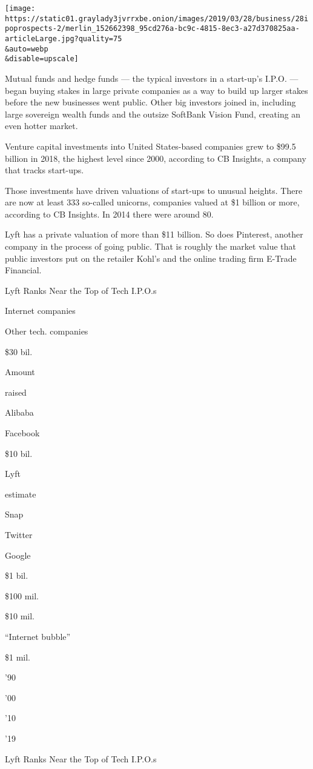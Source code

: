 \texttt{[image: https://static01.graylady3jvrrxbe.onion/images/2019/03/28/business/28ipoprospects-2/merlin\_152662398\_95cd276a-bc9c-4815-8ec3-a27d370825aa-articleLarge.jpg?quality=75\\\&auto=webp\\\&disable=upscale]}

Mutual funds and hedge funds --- the typical investors in a start-up's
I.P.O. --- began buying stakes in large private companies as a way to
build up larger stakes before the new businesses went public. Other big
investors joined in, including large sovereign wealth funds and the
outsize SoftBank Vision Fund, creating an even hotter market.

Venture capital investments into United States-based companies grew to
\$99.5 billion in 2018, the highest level since 2000, according to CB
Insights, a company that tracks start-ups.

Those investments have driven valuations of start-ups to unusual
heights. There are now at least 333 so-called unicorns, companies valued
at \$1 billion or more, according to CB Insights. In 2014 there were
around 80.

Lyft has a private valuation of more than \$11 billion. So does
Pinterest, another company in the process of going public. That is
roughly the market value that public investors put on the retailer
Kohl's and the online trading firm E-Trade Financial.

Lyft Ranks Near the Top of Tech I.P.O.s

Internet companies

Other tech. companies

\$30 bil.

Amount

raised

Alibaba

Facebook

\$10 bil.

Lyft

estimate

Snap

Twitter

Google

\$1 bil.

\$100 mil.

\$10 mil.

``Internet bubble''

\$1 mil.

'90

'00

'10

'19

Lyft Ranks Near the Top of Tech I.P.O.s


